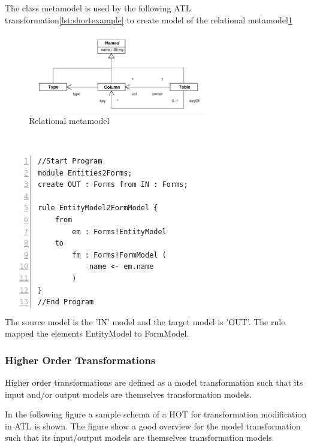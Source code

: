 \documentclass{llncs}
\begin{document}
The class metamodel is used by the following ATL transformation\ref{lst:shortexample} to create model of the relational metamodel\ref{fig:relational_metamodel_atl}\cite{atl:frederic}

\begin{figure}
	\centering
	\includegraphics[width=0.7\textwidth,natwidth=610,natheight=642]{figures/Relational_metamodel.jpg}
	\caption{Relational metamodel}
	\label{fig:relational_metamodel_atl}
\end{figure}~\cite{atl:frederic}

\begin{lstlisting}[language=ATL, numbers=left,xleftmargin=5.0ex, caption=Simple example for a ATL transformation, label=lst:shortexample]
//Start Program
module Entities2Forms;
create OUT : Forms from IN : Forms;

rule EntityModel2FormModel {
	from
		em : Forms!EntityModel
	to 
		fm : Forms!FormModel (
			name <- em.name
		)
}
//End Program
\end{lstlisting}

The source model is the 'IN' model and the target model is 'OUT'. The rule mapped the elements EntityModel to FormModel.

\subsubsection{Higher Order Transformations}

Higher order transformations are defined as a model transformation such that
its input and/or output models are themselves transformation models.\cite{Tisi:2009}

In the following figure a sample schema of a HOT for transformation modification
in ATL is shown. The figure show a good overview for the model transformation
such that its input/output models are themselves transformation models.
\end{document}
